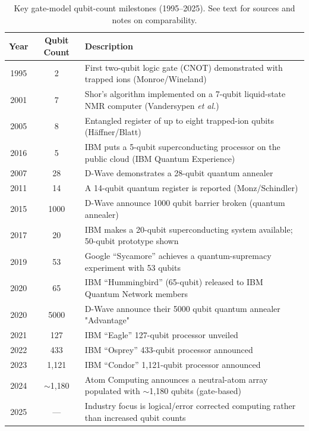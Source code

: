 \documentclass{elbioimp2}
\begin{document}
\begin{table}[t]
  \centering
  \begin{tabular}{|c|c|l|}
  \hline
  \textbf{Year} & \textbf{Qubit Count} & \textbf{Description} \\
  \hline
  1995 & 2 & First two-qubit logic gate (CNOT) demonstrated with trapped ions (Monroe/Wineland) \\
  \hline
  2001 & 7 & Shor’s algorithm implemented on a 7-qubit liquid-state NMR computer (Vandersypen \textit{et al.}) \\
  \hline
  2005 & 8 & Entangled register of up to eight trapped-ion qubits (Häffner/Blatt) \\
  \hline
  2016 & 5 & IBM puts a 5-qubit superconducting processor on the public cloud (IBM Quantum Experience) \\
  \hline
  2007 & 28 & D-Wave demonstrates a 28-qubit quantum annealer \\
  \hline
  2011 & 14 & A 14-qubit quantum register is reported (Monz/Schindler) \\
  \hline
  2015 & 1000 & D-Wave announce 1000 qubit barrier broken (quantum annealer)\\
  \hline
  2017 & 20 & IBM makes a 20-qubit superconducting system available; 50-qubit prototype shown \\
  \hline
  2019 & 53 & Google “Sycamore” achieves a quantum-supremacy experiment with 53 qubits \\
  \hline
  2020 & 65 & IBM “Hummingbird” (65-qubit) released to IBM Quantum Network members \\
  \hline
  2020 & 5000 & D-Wave announce their 5000 qubit quantum annealer "Advantage" \\
  \hline
  2021 & 127 & IBM “Eagle” 127-qubit processor unveiled \\
  \hline
  2022 & 433 & IBM “Osprey” 433-qubit processor announced \\
  \hline
  2023 & 1{,}121 & IBM “Condor” 1{,}121-qubit processor announced \\
  \hline
  2024 & $\sim$1{,}180 & Atom Computing announces a neutral-atom array populated with $\sim$1{,}180 qubits (gate-based) \\
  \hline
  2025 & — & Industry focus is logical/error corrected computing rather than increased qubit counts \\
  \hline
  \end{tabular}
  \caption{Key gate-model qubit-count milestones (1995–2025). See text for sources and notes on comparability.}
  \label{tab:gate_model_qubit_counts}
\end{table}
\end{document}

